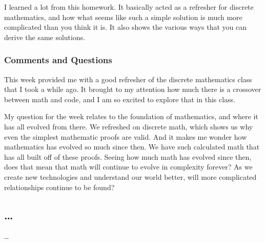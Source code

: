\documentclass{article}
\theoremstyle{theorem}
\theoremstyle{definition}
\theoremstyle{remark}
\begin{document}
I learned a lot from this homework. It basically acted as a refresher for discrete mathematics, and 
how what seems like such a simple solution is much more complicated than you think it is. It also shows 
the various ways that you can derive the same solutions.


%
%

\subsubsection*{Comments and Questions}

This week provided me with a good refresher of the discrete mathematics class that I took a while ago. It brought to my attention how much
there is a crossover between math and code, and I am so excited to explore that in this class.

My question for the week relates to the foundation of mathematics, and where it has all evolved from there. We refreshed on discrete math,
which shows us why even the simplest mathematic proofs are valid. And it makes me wonder how mathematics has evolved so much since then. We have
such calculated math that has all built off of these proofs. Seeing how much math has evolved since then, does that mean that math will continue to
evolve in complexity forever? As we create new technologies and understand our world better, will more complicated relationships continue to be found?
\subsection{\ldots}

\ldots

\end{document}
